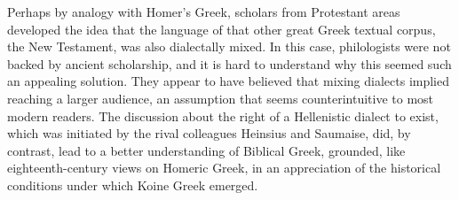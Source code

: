 Perhaps by analogy with Homer’s Greek, scholars from Protestant areas developed the idea that the language of that other great Greek textual corpus, the New Testament, was also dialectally mixed. In this case, philologists were not backed by ancient scholarship, and it is hard to understand why this seemed such an appealing solution. They appear to have believed that mixing dialects implied reaching a larger audience, an assumption that seems counterintuitive to most modern readers. The discussion about the right of a Hellenistic dialect to exist, which was initiated by the rival colleagues Heinsius and Saumaise, did, by contrast, lead to a better understanding of Biblical Greek, grounded, like eighteenth-century views on Homeric Greek, in an appreciation of the historical conditions under which Koine Greek emerged.

